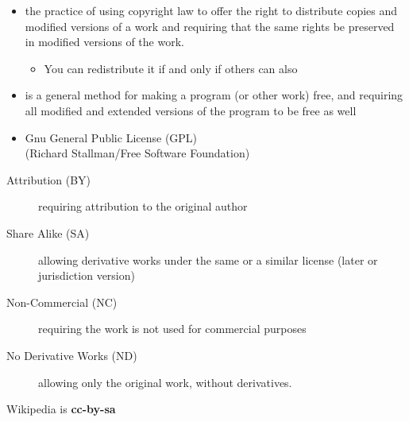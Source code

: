 \documentclass[a4paper,landscape,headrule,footrule,xetex]{foils}
\begin{document}

\begin{itemize}
\item the practice of using copyright law to offer the right to distribute copies and modified versions of a work and requiring that the same rights be preserved in modified versions of the work.
  \begin{itemize}
  \item You can redistribute it if and only if others can also
  \end{itemize}
\item {} is a general method for making a program (or other work) free, and requiring all modified and extended versions of the program to be free as well
\item Gnu General Public License (GPL)
 \\ (Richard Stallman/Free Software Foundation)
\end{itemize}



\begin{description}
\item [Attribution (BY)] requiring attribution to the original author
\item [Share Alike (SA)] allowing derivative  works under the same or a similar license (later or jurisdiction version)
\item [Non-Commercial (NC)] requiring the work is not used for commercial purposes
\item [No Derivative Works (ND)] allowing only the original work, without derivatives.
\end{description}

Wikipedia is \textbf{cc-by-sa}

\end{document}

